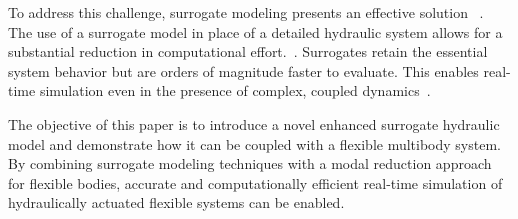To address this challenge, surrogate modeling presents an effective solution ~\cite{alizadeh_2020_managing}. The use of a surrogate model in place of a detailed hydraulic system allows for a substantial reduction in computational effort.~\cite{khadim2024simulation}. Surrogates retain the essential system behavior but are orders of magnitude faster to evaluate. This enables real-time simulation even in the presence of complex, coupled dynamics~\cite{go_2024_a}.

The objective of this paper is to introduce a novel enhanced surrogate hydraulic model and demonstrate how it can be coupled with a flexible multibody system. By combining surrogate modeling techniques with a modal reduction approach for flexible bodies, accurate and computationally efficient real-time simulation of hydraulically actuated flexible systems can be enabled.

